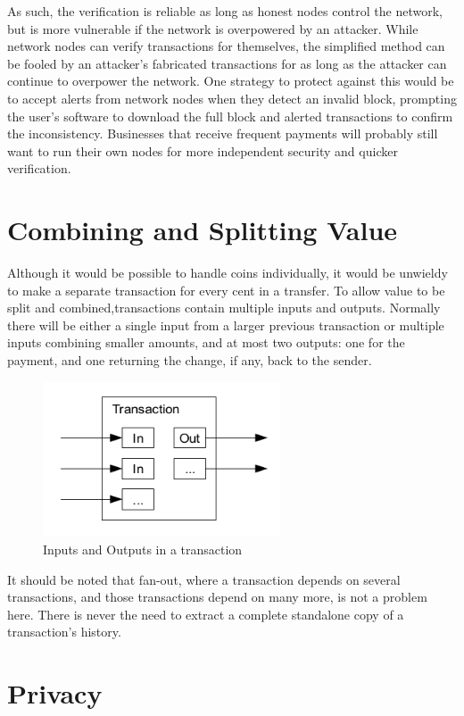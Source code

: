 As such, the verification is reliable as long as honest nodes control the network, but is more vulnerable if the network is overpowered by an attacker. While network nodes can verify transactions for themselves, the simplified method can be fooled by an attacker's fabricated transactions for as long as the attacker can continue to overpower the network. One strategy to protect against this would be to accept alerts from network nodes when they detect an invalid block, prompting the user's software to download the full block and alerted transactions to confirm the inconsistency. Businesses that receive frequent payments will probably still want to run their own nodes for more independent security and quicker verification.

\section{Combining and Splitting Value}

Although it would be possible to handle coins individually, it would be unwieldy to make a separate transaction for every cent in a transfer. To allow value to be split and combined,transactions contain multiple inputs and outputs. Normally there will be either a single input from a larger previous transaction or multiple inputs combining smaller amounts, and at most two outputs: one for the payment, and one returning the change, if any, back to the sender.

\begin{figure}[ht!]
\centering
\includegraphics[trim = 0mm 0mm 0mm 0mm, width=70mm]{images/multiple_in_outs_transaction}
\caption{Inputs and Outputs in a transaction}
\end{figure}

It should be noted that fan-out, where a transaction depends on several transactions, and those transactions depend on many more, is not a problem here. There is never the need to extract a complete standalone copy of a transaction's history.

\section{Privacy}

